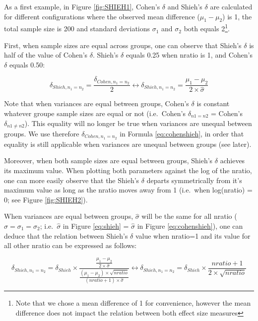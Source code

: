 \documentclass[man]{apa6}
\let\rmarkdownfootnote\footnote%
\def\footnote{\protect\rmarkdownfootnote}
\begin{document}
As a first example, in Figure \ref{fig:SHIEH1}, Cohen's \(\delta\) and Shieh's \(\delta\) are calculated for different configurations where the observed mean difference (\(\mu_{1}-\mu_{2}\)) is 1, the total sample size is 200 and standard deviations \(\sigma_{1}\) and \(\sigma_{2}\) both equals 2\footnote{Note that we chose a mean difference of 1 for convenience, however the mean difference does not impact the relation between both effect size measures}.

First, when sample sizes are equal across groups, one can observe that Shieh's \(\delta\) is half of the value of Cohen's \(\delta\). Shieh's \(\delta\) equals 0.25 when nratio is 1, and Cohen's \(\delta\) equals 0.50:

\begin{equation} 
\delta_{Shieh,n_1=n_2} = \frac{\delta_{Cohen,n_1=n_2}}{2}
\leftrightarrow \delta_{Shieh,n_1=n_2}= \frac{\mu_1-\mu_2}{2 \times \hat{\sigma}} 
\label{eq:cohenshieh}
\end{equation}

Note that when variances are equal between groups, Cohen's \(\delta\) is constant whatever groupe sample sizes are equal or not (i.e.~Cohen's \(\delta_{n1=n2}\) = Cohen's \(\delta_{n1 \neq n2}\)). This equality will no longer be true when variances are unequal between groups. We use therefore \(\delta_{Cohen, n_1=n_2}\) in Formula \ref{eq:cohenshieh}, in order that equality is still applicable when variances are unequal between groups (see later).

Moreover, when both sample sizes are equal between groups, Shieh's \(\delta\) achieves its maximum value. When plotting both parameters against the log of the nratio, one can more easily observe that the Shieh's \(\delta\) departs symmetrically from it's maximum value as long as the nratio moves away from 1 (i.e.~when log(nratio) = 0; see Figure \ref{fig:SHIEH2}).

When variances are equal between groups, \(\hat{\sigma}\) will be the same for all nratio (\(\hat{\sigma}=\sigma_1=\sigma_2\); i.e.~\(\hat{\sigma}\) in Figure \ref{eq:shieh} = \(\hat{\sigma}\) in Figure \ref{eq:cohenshieh}), one can deduce that the relation between Shieh's \(\delta\) value when nratio=1 and its value for all other nratio can be expressed as follows:

\begin{equation} 
\delta_{Shieh,n_1=n_2}= \delta_{Shieh} \times \frac{\frac{\mu_1-\mu_2}{2 \times \hat{\sigma}}}{\frac{(\mu_1-\mu_2) \times \sqrt{nratio}}{(nratio+1) \times \hat{\sigma}}}
\leftrightarrow \delta_{Shieh,n_1=n_2}= \delta_{Shieh} \times \frac{nratio+1}{2 \times \sqrt{nratio}}
\label{eq:shiehvsmax}
\end{equation}
\end{document}
